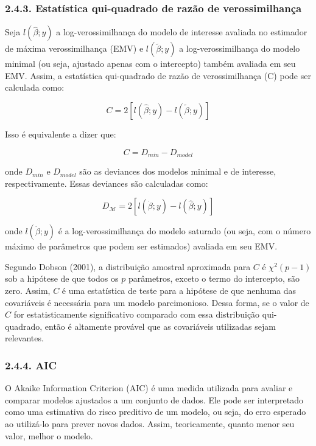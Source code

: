 \documentclass[
]{article}
\begin{document}
\subsubsection{2.4.3. Estatística qui-quadrado de razão de
verossimilhança}\label{estatuxedstica-qui-quadrado-de-razuxe3o-de-verossimilhanuxe7a}

Seja \(l(\hat{\beta}; y)\) a log-verossimilhança do modelo de interesse
avaliada no estimador de máxima verossimilhança (EMV) e
\(l(\tilde{\beta}; y)\) a log-verossimilhança do modelo minimal (ou
seja, ajustado apenas com o intercepto) também avaliada em seu EMV.
Assim, a estatística qui-quadrado de razão de verossimilhança (C) pode
ser calculada como:

\[
C = 2[l(\hat{\beta}; y) - l(\tilde{\beta}; y)]
\]

Isso é equivalente a dizer que:

\[
C = D_{min} - D_{model}
\]

onde \(D_{min}\) e \(D_{model}\) são as deviances dos modelos minimal e
de interesse, respectivamente. Essas deviances são calculadas como:

\[
D_{\mathcal{M}} = 2[l(\dot{\beta}; y) - l(\hat{\beta}; y)]
\]

onde \(l(\dot{\beta}; y)\) é a log-verossimilhança do modelo saturado
(ou seja, com o número máximo de parâmetros que podem ser estimados)
avaliada em seu EMV.

Segundo Dobson (2001), a distribuição amostral aproximada para \(C\) é
\(\chi^2(p-1)\) sob a hipótese de que todos os \(p\) parâmetros, exceto
o termo do intercepto, são zero. Assim, \(C\) é uma estatística de teste
para a hipótese de que nenhuma das covariáveis é necessária para um
modelo parcimonioso. Dessa forma, se o valor de \(C\) for
estatisticamente significativo comparado com essa distribuição
qui-quadrado, então é altamente provável que as covariáveis utilizadas
sejam relevantes.

\subsubsection{2.4.4. AIC}\label{aic}

O Akaike Information Criterion (AIC) é uma medida utilizada para avaliar
e comparar modelos ajustados a um conjunto de dados. Ele pode ser
interpretado como uma estimativa do risco preditivo de um modelo, ou
seja, do erro esperado ao utilizá-lo para prever novos dados. Assim,
teoricamente, quanto menor seu valor, melhor o modelo.
\end{document}
